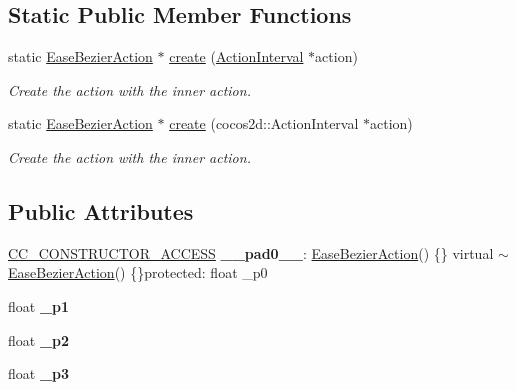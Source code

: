 \subsection*{Static Public Member Functions}
\begin{DoxyCompactItemize}
\item 
static \hyperlink{classEaseBezierAction}{Ease\+Bezier\+Action} $\ast$ \hyperlink{classEaseBezierAction_a1928cb8f686f7add882625a4647b2708}{create} (\hyperlink{classActionInterval}{Action\+Interval} $\ast$action)
\begin{DoxyCompactList}\small\item\em Create the action with the inner action. \end{DoxyCompactList}\item 
static \hyperlink{classEaseBezierAction}{Ease\+Bezier\+Action} $\ast$ \hyperlink{classEaseBezierAction_a3a5c9f7c3061432ad649cda22daa5cd7}{create} (cocos2d\+::\+Action\+Interval $\ast$action)
\begin{DoxyCompactList}\small\item\em Create the action with the inner action. \end{DoxyCompactList}\end{DoxyCompactItemize}
\subsection*{Public Attributes}
\begin{DoxyCompactItemize}
\item 
\mbox{\label{classEaseBezierAction_a00dea72ee94592df457d29acc69874fc}} 
\hyperlink{_2cocos2d_2cocos_2base_2ccConfig_8h_a25ef1314f97c35a2ed3d029b0ead6da0}{C\+C\+\_\+\+C\+O\+N\+S\+T\+R\+U\+C\+T\+O\+R\+\_\+\+A\+C\+C\+E\+SS} {\bfseries \+\_\+\+\_\+pad0\+\_\+\+\_\+}\+: \hyperlink{classEaseBezierAction}{Ease\+Bezier\+Action}() \{\} virtual $\sim$\hyperlink{classEaseBezierAction}{Ease\+Bezier\+Action}() \{\}protected\+: float \+\_\+p0
\item 
\mbox{\label{classEaseBezierAction_a2085e1a8a66373df5d5549d978dc3533}} 
float {\bfseries \+\_\+p1}
\item 
\mbox{\label{classEaseBezierAction_abcbf84704d99a7355f1d9492414ab9d6}} 
float {\bfseries \+\_\+p2}
\item 
\mbox{\label{classEaseBezierAction_a18dc85e45db9a57a71e4db2d56aefbe9}} 
float {\bfseries \+\_\+p3}
\end{DoxyCompactItemize}
